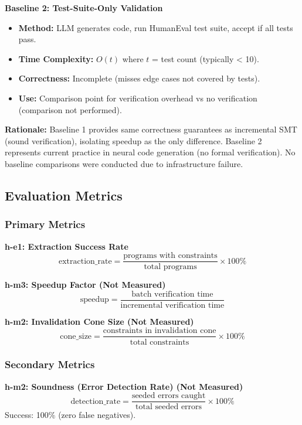 \textbf{Baseline 2: Test-Suite-Only Validation}
\begin{itemize}
\item \textbf{Method:} LLM generates code, run HumanEval test suite, accept if all tests pass.
\item \textbf{Time Complexity:} $O(t)$ where $t$ = test count (typically < 10).
\item \textbf{Correctness:} Incomplete (misses edge cases not covered by tests).
\item \textbf{Use:} Comparison point for verification overhead vs no verification (comparison not performed).
\end{itemize}

\textbf{Rationale:} Baseline 1 provides same correctness guarantees as incremental SMT (sound verification), isolating speedup as the only difference. Baseline 2 represents current practice in neural code generation (no formal verification). No baseline comparisons were conducted due to infrastructure failure.

\subsection{Evaluation Metrics}

\subsubsection{Primary Metrics}

\textbf{h-e1: Extraction Success Rate}
\[
\text{extraction\_rate} = \frac{\text{programs with constraints}}{\text{total programs}} \times 100\%
\]

\textbf{h-m3: Speedup Factor (Not Measured)}
\[
\text{speedup} = \frac{\text{batch verification time}}{\text{incremental verification time}}
\]

\textbf{h-m2: Invalidation Cone Size (Not Measured)}
\[
\text{cone\_size} = \frac{\text{constraints in invalidation cone}}{\text{total constraints}} \times 100\%
\]

\subsubsection{Secondary Metrics}

\textbf{h-m2: Soundness (Error Detection Rate) (Not Measured)}
\[
\text{detection\_rate} = \frac{\text{seeded errors caught}}{\text{total seeded errors}} \times 100\%
\]
Success: 100\% (zero false negatives).

